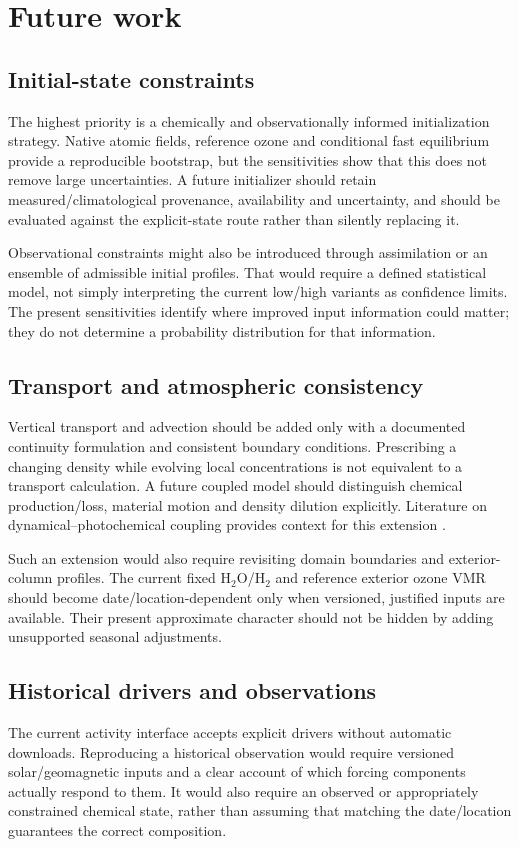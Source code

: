 \chapter{Future work}\label{ch:future}
\section{Initial-state constraints}
The highest priority is a chemically and observationally informed initialization strategy. Native atomic fields, reference ozone and conditional fast equilibrium provide a reproducible bootstrap, but the sensitivities show that this does not remove large uncertainties. A future initializer should retain measured/climatological provenance, availability and uncertainty, and should be evaluated against the explicit-state route rather than silently replacing it.

Observational constraints might also be introduced through assimilation or an ensemble of admissible initial profiles. That would require a defined statistical model, not simply interpreting the current low/high variants as confidence limits. The present sensitivities identify where improved input information could matter; they do not determine a probability distribution for that information.

\section{Transport and atmospheric consistency}
Vertical transport and advection should be added only with a documented continuity formulation and consistent boundary conditions. Prescribing a changing density while evolving local concentrations is not equivalent to a transport calculation. A future coupled model should distinguish chemical production/loss, material motion and density dilution explicitly. Literature on dynamical--photochemical coupling provides context for this extension \citep{zhu2007}.

Such an extension would also require revisiting domain boundaries and exterior-column profiles. The current fixed H$_2$O/H$_2$ and reference exterior ozone VMR should become date/location-dependent only when versioned, justified inputs are available. Their present approximate character should not be hidden by adding unsupported seasonal adjustments.

\section{Historical drivers and observations}
The current activity interface accepts explicit drivers without automatic downloads. Reproducing a historical observation would require versioned solar/geomagnetic inputs and a clear account of which forcing components actually respond to them. It would also require an observed or appropriately constrained chemical state, rather than assuming that matching the date/location guarantees the correct composition.

